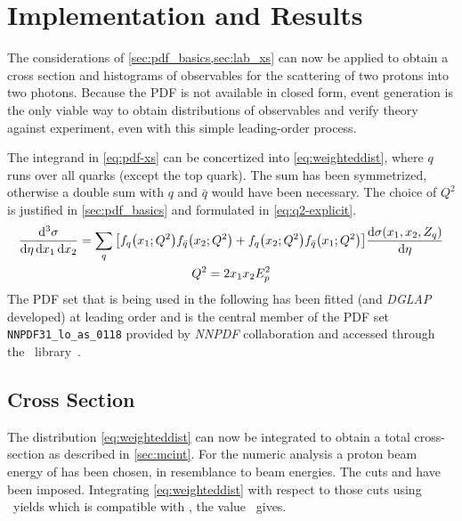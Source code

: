 \section{Implementation and Results}%
\label{sec:pdf_results}

The considerations of \cref{sec:pdf_basics,sec:lab_xs} can now be
applied to obtain a cross section and histograms of observables for
the scattering of two protons into two photons. Because the PDF is not
available in closed form, event generation is the only viable way to
obtain distributions of observables and verify theory against
experiment, even with this simple leading-order process.

The integrand in \cref{eq:pdf-xs} can be concertized into
\cref{eq:weighteddist}, where \(q\) runs over all quarks (except the
top quark). The sum has been symmetrized, otherwise a double sum with
\(q\) and \(\bar{q}\) would have been necessary. The choice of \(Q^2\)
is justified in \cref{sec:pdf_basics} and formulated in
\cref{eq:q2-explicit}.
%
\begin{gather}
  \label{eq:weighteddist}
  \frac{\dd[3]{\sigma}}{\dd{\eta}\dd{x_1}\dd{x_2}} =
  \sum_q \qty[f_q\qty(x_1;Q^2) f_{\bar{q}}\qty(x_2;Q^2) + f_q\qty(x_2;Q^2) f_{\bar{q}}\qty(x_1;Q^2)] \dv{\sigma(x_1,
    x_2, Z_q)}{\eta} \\
  \label{eq:q2-explicit}
  Q^2 = 2x_1x_2E_p^2
\end{gather}
%
The PDF set that is being used in the following has been fitted (and
\emph{DGLAP} developed) at leading order and is the central member of
the PDF set \verb|NNPDF31_lo_as_0118| provided by \emph{NNPDF}
collaboration and accessed through the \lhapdf\
library~\cite{NNPDF:2017pd,Buckley:2015lh}.

\subsection{Cross Section}%
\label{sec:ppxs}

The distribution \cref{eq:weighteddist} can now be integrated to
obtain a total cross-section as described in \cref{sec:mcint}.  For
the numeric analysis a proton beam energy of
 has been chosen, in resemblance to
\lhc{} beam energies. The cuts \result{xs/python/pdf/eta} and
 have been imposed. Integrating
\cref{eq:weighteddist} with respect to those cuts using \vegas\ yields
\result{xs/python/pdf/my_sigma} which is compatible with
, the value \sherpa\ gives.

